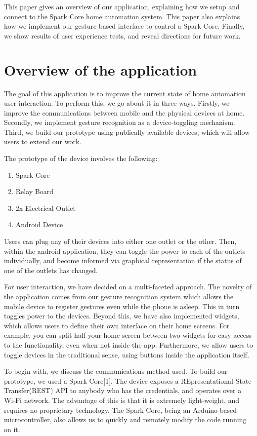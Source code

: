 \documentclass[journal]{IEEEtran}
\begin{document}
This paper gives an overview of our application, explaining how we setup and connect to the Spark Core home automation system. This paper also explains how we implement our gesture based interface to control a Spark Core. Finally, we  show results of user experience tests, and reveal directions for future work.

\section{Overview of the application}
The goal of this application is to improve the current state of home automation user interaction. To perform this, we go about it in three ways. Firstly, we improve the communications between mobile and the physical devices at home. Secondly, we implement gesture recognition as a device-toggling mechanism. Third, we build our prototype using publically available devices, which will allow users to extend our work.  

The prototype of the device involves the following:
\begin{enumerate}
	\item Spark Core
	\item Relay Board
	\item 2x Electrical Outlet
	\item Android Device
\end{enumerate}

Users can plug any of their devices into either one outlet or the other. Then, within the android application, they can toggle the power to each of the outlets individually, and become informed via graphical representation if the status of one of the outlets has changed.

For user interaction, we have decided on a multi-faceted approach. The novelty of the application comes from our gesture recognition system which allows the mobile device to register gestures even while the phone is asleep. This in turn toggles power to the devices.  Beyond this, we have also implemented widgets, which allows users to define their own interface on their home screens. For example, you can split half your home screen between two widgets for easy access to the functionality, even when not inside the app. Furthermore, we allow users to toggle devices in the traditional sense, using buttons inside the application itself. 

To begin with, we discuss the communications method used. To build our prototype, we used a Spark Core[1]. The device exposes a REpresentational State Transfer(REST) API to anybody who has the credentials, and operates over a Wi-Fi network. The advantage of this is that it is extremely light-weight, and requires no proprietary technology. The Spark Core, being an Arduino-based microcontroller, also allows us to quickly and remotely modify the code running on it. 
\end{document}
